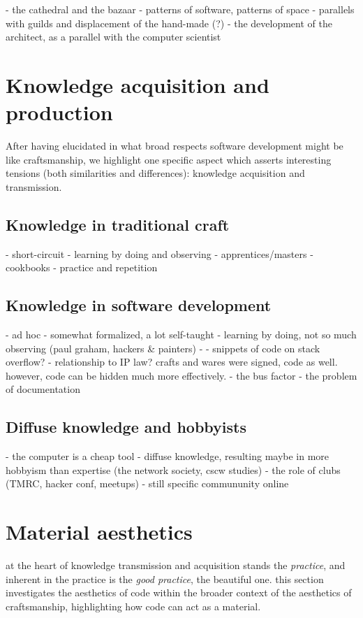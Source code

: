\documentclass{article}
\begin{document}
- the cathedral and the bazaar
- patterns of software, patterns of space
- parallels with guilds and displacement of the hand-made (?)
- the development of the architect, as a parallel with the computer scientist

\section{Knowledge acquisition and production}

After having elucidated in what broad respects software development might be like craftsmanship, we highlight one specific aspect which asserts interesting tensions (both similarities and differences): knowledge acquisition and transmission.

\subsection{Knowledge in traditional craft}

- short-circuit
- learning by doing and observing
- apprentices/masters
- cookbooks
- practice and repetition

\subsection{Knowledge in software development}

- ad hoc
- somewhat formalized, a lot self-taught
- learning by doing, not so much observing (paul graham, hackers \& painters)
- - snippets of code on stack overflow?
- relationship to IP law? crafts and wares were signed, code as well. however, code can be hidden much more effectively.
- the bus factor
- the problem of documentation

\subsection{Diffuse knowledge and hobbyists}

- the computer is a cheap tool
- diffuse knowledge, resulting maybe in more hobbyism than expertise (the network society, cscw studies)
- the role of clubs (TMRC, hacker conf, meetups)
- still specific commununity online

\section{Material aesthetics}

at the heart of knowledge transmission and acquisition stands the \emph{practice}, and inherent in the practice is the \emph{good practice}, the beautiful one. this section investigates the aesthetics of code within the broader context of the aesthetics of craftsmanship, highlighting how code can act as a material.
\end{document}
